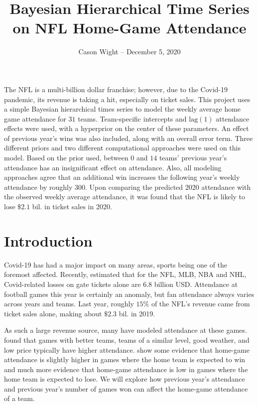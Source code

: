 \documentclass[11pt]{article}
\renewenvironment{abstract}
               {\list{}{\rightmargin\leftmargin}%
                \item[\hspace{10mm}\textbf{Abstract --- }]\relax}
               {\endlist}
\begin{document}
\title{Bayesian Hierarchical Time Series on NFL Home-Game Attendance}
\author{Cason Wight -- December 5, 2020}
\date{\vspace{-5ex}}
\maketitle


\begin{abstract}
The NFL is a multi-billion dollar franchise; however, due to the Covid-19 pandemic, its revenue is taking a hit, especially on ticket sales. This project uses a simple Bayesian hierarchical times series to model the weekly average home game attendance for $31$ teams. Team-specific intercepts and $\text{lag}(1)$ attendance effects were used, with a hyperprior on the center of these parameters. An effect of previous year's wins was also included, along with an overall error term. Three different priors and two different computational approaches were used on this model. Based on the prior used, between $0$ and $14$ teams' previous year's attendance has an insignificant effect on attendance. Also, all modeling approaches agree that an additional win increases the following year's weekly attendance by roughly $300$. Upon comparing the predicted 2020 attendance with the observed weekly average attendance, it was found that the NFL is likely to lose $\$2.1$ bil. in ticket sales in 2020.
\end{abstract}

\vspace*{-.5\baselineskip}
\section{Introduction}


Covid-19 has had a major impact on many areas, sports being one of the foremost affected. Recently, \cite{ehrlich2020covid} estimated that for the NFL, MLB, NBA and NHL, Covid-related losses on gate tickets alone are 6.8 billion USD. Attendance at football games this year is certainly an anomaly, but fan attendance always varies across years and teams. Last year, roughly $15\%$ of the NFL's revenue came from ticket sales alone, making about $\$2.3$ bil. in 2019. 

As such a large revenue source, many have modeled attendance at these games. \cite{welki1999us} found that games with better teams, teams of a similar level, good weather, and low price typically have higher attendance. \cite{coates2010week} show some evidence that home-game attendance is slightly higher in games where the home team is expected to win and much more evidence that home-game attendance is low in games where the home team is expected to lose.  We will explore how previous year's attendance and previous year's number of games won can affect the home-game attendance of a team.
\end{document}
